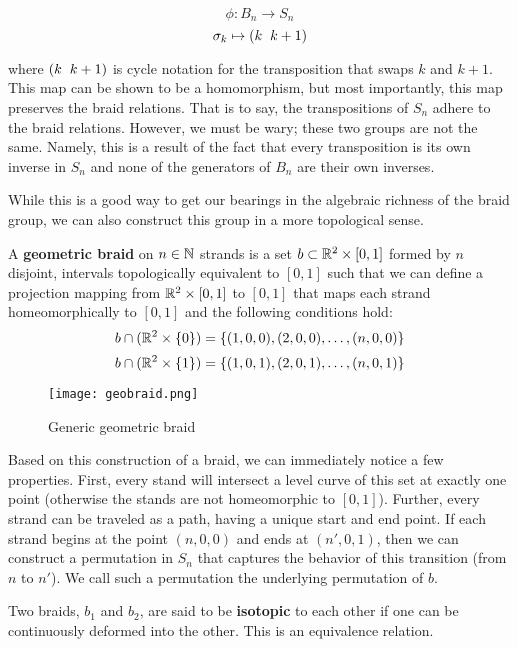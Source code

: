 $$\phi:B_n\rightarrow S_n$$
$$\sigma_k \mapsto (k \hspace{2mm} k+1)$$

\noindent where $(k \hspace{2mm}k+1)$ is cycle notation for the transposition that swaps $k$ and $k+1$. This map can be shown to be a homomorphism, but most importantly, this map preserves the braid relations. That is to say, the transpositions of $S_n$ adhere to the braid relations. However, we must be wary; these two groups are not the same. Namely, this is a result of the fact that every transposition is its own inverse in $S_n$ and none of the generators of $B_n$ are their own inverses. 

While this is a good way to get our bearings in the algebraic richness of the braid group, we can also construct this group in a more topological sense.

\begin{definition}
	A \textbf{geometric braid} on $n\in \mathbb{N}$ strands is a set $b\subset\mathbb{R}^2\times [0,1]$ formed by $n$ disjoint, intervals topologically equivalent to $[0,1]$ such that we can define a projection mapping from $\mathbb{R}^2\times [0,1]$ to $[0,1]$ that maps each strand homeomorphically to $[0,1]$ and the following conditions hold:
$$b\cap(\mathbb{R}^2\times\{0\}) = \{(1,0,0),(2,0,0),\hdots,(n,0,0)\}$$
$$b\cap(\mathbb{R}^2\times\{1\}) = \{(1,0,1),(2,0,1),\hdots,(n,0,1)\}$$
\end{definition}

\begin{figure}[H]
	\centering
	\texttt{[image: geobraid.png]}
	\caption{Generic geometric braid}
\end{figure}

Based on this construction of a braid, we can immediately notice a few properties. First, every stand will intersect a level curve of this set at exactly one point (otherwise the stands are not homeomorphic to $[0,1]$). Further, every strand can be traveled as a path, having a unique start and end point. If each strand begins at the point $(n,0,0)$ and ends at $(n',0,1)$, then we can construct a permutation in $S_n$ that captures the behavior of this transition (from $n$ to $n'$). We call such a permutation the underlying permutation of $b$.

\begin{definition}
	Two braids, $b_1$ and $b_2$, are said to be \textbf{isotopic} to each other if one can be continuously deformed into the other. This is an equivalence relation.
\end{definition}

